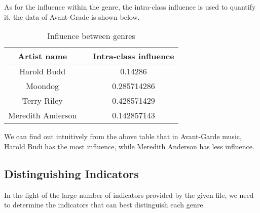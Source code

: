 \documentclass{mcmthesis}
\begin{document}
As for the influence within the genre, the intra-class influence  is used to quantify it, the data of Avant-Grade is shown below.
\begin{table}[H]
	\centering  
	\caption{Influence between genres}
	
	\label{table_time}
	
	\begin{tabular}{ccc}  
		
		\toprule   
		
		Artist name&\quad &Intra-class influence \\ 
		
		\midrule   
		Harold Budd&\quad &0.14286 \\
		Moondog&\quad&0.285714286
		    \\  
		
		Terry Riley& \quad&  0.428571429
		\\    
		
		Meredith Anderson&\quad& 0.142857143
		 \\
		
		\bottomrule  
		
	\end{tabular}
\end{table}
  We can find out intuitively from the above table that in Avant-Garde music, Harold Budi has the most influence, while Meredith Anderson has less influence.
 \subsection{Distinguishing Indicators}

 
 In the light of the large number of indicators provided by the given file, we need to determine the indicators that can best distinguish each genre. 
 
\end{document}
